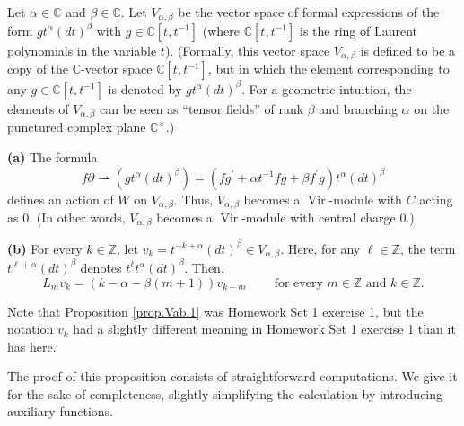 \documentclass[etingof-lie.tex]{subfiles}
\begin{document}
\begin{proposition}
\label{prop.Vab.1}Let $\alpha\in\mathbb{C}$ and $\beta\in\mathbb{C}$. Let
$V_{\alpha,\beta}$ be the vector space of formal expressions of the form
$gt^{\alpha}\left(  dt\right)  ^{\beta}$ with $g\in\mathbb{C}\left[
t,t^{-1}\right]  $ (where $\mathbb{C}\left[  t,t^{-1}\right]  $ is the ring of
Laurent polynomials in the variable $t$). (Formally, this vector space
$V_{\alpha,\beta}$ is defined to be a copy of the $\mathbb{C}$-vector space
$\mathbb{C}\left[  t,t^{-1}\right]  $, but in which the element corresponding
to any $g\in\mathbb{C}\left[  t,t^{-1}\right]  $ is denoted by $gt^{\alpha
}\left(  dt\right)  ^{\beta}$. For a geometric intuition, the elements of
$V_{\alpha,\beta}$ can be seen as ``tensor fields'' of rank $\beta$ and
branching $\alpha$ on the punctured complex plane $\mathbb{C}^{\times}$.)

\textbf{(a)} The formula
\begin{equation}
f\partial\rightharpoonup\left(  gt^{\alpha}\left(  dt\right)  ^{\beta}\right)
=\left(  fg^{\prime}+\alpha t^{-1}fg+\beta f^{\prime}g\right)  t^{\alpha
}\left(  dt\right)  ^{\beta} \label{ex1.1.1}%
\end{equation}
defines an action of $W$ on $V_{\alpha,\beta}$. Thus, $V_{\alpha,\beta}$
becomes a $\operatorname*{Vir}$-module with $C$ acting as $0$. (In other
words, $V_{\alpha,\beta}$ becomes a $\operatorname*{Vir}$-module with central
charge $0$.)

\textbf{(b)} For every $k\in\mathbb{Z}$, let $v_{k}=t^{-k+\alpha}\left(
dt\right)  ^{\beta}\in V_{\alpha,\beta}$. Here, for any $\ell\in\mathbb{Z}$,
the term $t^{\ell+\alpha}\left(  dt\right)  ^{\beta}$ denotes $t^{\ell
}t^{\alpha}\left(  dt\right)  ^{\beta}$. Then,%
\begin{equation}
L_{m}v_{k}=\left(  k-\alpha-\beta\left(  m+1\right)  \right)  v_{k-m}%
\ \ \ \ \ \ \ \ \ \ \text{for every }m\in\mathbb{Z}\text{ and }k\in\mathbb{Z}.
\label{ex1.1.2.var}%
\end{equation}

\end{proposition}

Note that Proposition \ref{prop.Vab.1} was Homework Set 1 exercise 1, but the
notation $v_{k}$ had a slightly different meaning in Homework Set 1 exercise 1
than it has here.

The proof of this proposition consists of straightforward computations. We
give it for the sake of completeness, slightly simplifying the calculation by
introducing auxiliary functions.
\end{document}
